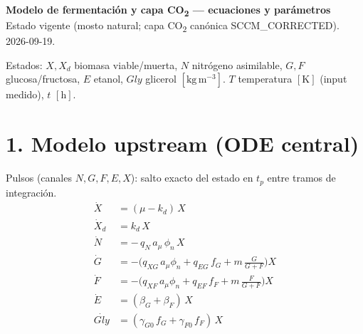 \documentclass[11pt,a4paper]{article}
\newcommand{\kgm}{\ensuremath{\mathrm{kg\,m^{-3}}}}
\begin{document}
\begin{center}
{\Large\bfseries Modelo de fermentación y capa CO\textsubscript{2} --- ecuaciones y parámetros}\\[2pt]
Estado vigente (mosto natural; capa CO\textsubscript{2} canónica SCCM\_CORRECTED). 2026-09-19.
\end{center}

Estados: $X,X_d$ biomasa viable/muerta, $N$ nitrógeno asimilable, $G,F$ glucosa/fructosa,
$E$ etanol, $Gly$ glicerol $[\kgm]$. $T$ temperatura $[\mathrm{K}]$ (input medido), $t$ $[\mathrm{h}]$.

\section*{1. Modelo upstream (ODE central)}

Pulsos (canales $N,G,F,E,X$): salto exacto del estado en $t_p$ entre tramos de integración.
\begin{align}
\dot X &= (\mu - k_d)\,X \tag{U1}\\
\dot X_d &= k_d\,X \tag{U2}\\
\dot N &= -\,q_N\,a_\mu\,\phi_n\,X \tag{U3}\\
\dot G &= -\Big(q_{XG}\,a_\mu\phi_n + q_{EG}\,f_G + m\,\frac{G}{G+F}\Big)X \tag{U4}\\
\dot F &= -\Big(q_{XF}\,a_\mu\phi_n + q_{EF}\,f_F + m\,\frac{F}{G+F}\Big)X \tag{U5}\\
\dot E &= (\beta_G+\beta_F)\,X \tag{U6}\\
\dot{Gly} &= (\gamma_{G0}\,f_G + \gamma_{F0}\,f_F)\,X \tag{U7}
\end{align}
\end{document}
